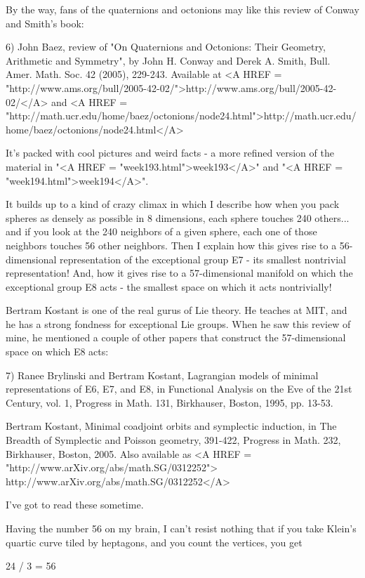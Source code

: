 By the way, fans of the quaternions and octonions may like this
review of Conway and Smith's book:

6) John Baez, review of "On Quaternions and Octonions: Their Geometry,
Arithmetic and Symmetry", by John H. Conway and Derek A. Smith,
Bull. Amer. Math. Soc. 42 (2005), 229-243.  Available at 
<A HREF = "http://www.ams.org/bull/2005-42-02/">http://www.ams.org/bull/2005-42-02/</A> and 
<A HREF = "http://math.ucr.edu/home/baez/octonions/node24.html">http://math.ucr.edu/home/baez/octonions/node24.html</A>

It's packed with cool pictures and weird facts - a more refined
version of the material in "<A HREF = "week193.html">week193</A>" and "<A HREF = "week194.html">week194</A>".  

It builds up to a kind of crazy climax in which I describe how when you 
pack spheres as densely as possible in 8 dimensions, each sphere touches 
240 others... and if you look at the 240 neighbors of a given sphere, each 
one of those neighbors touches 56 other neighbors.  Then I explain how this 
gives rise to a 56-dimensional representation of the exceptional group E7 -
its smallest nontrivial representation!  And, how it
gives rise to a 57-dimensional manifold on which the exceptional group E8 
acts - the smallest space on which it acts nontrivially!   

Bertram Kostant is one of the real gurus of Lie theory.  He teaches at
MIT, and he has a strong fondness for exceptional Lie groups.  When he saw 
this review of mine, he mentioned a couple of other papers that construct 
the 57-dimensional space on which E8 acts:

7) Ranee Brylinski and Bertram Kostant, Lagrangian models of minimal
representations of E6, E7, and E8, in Functional Analysis on the Eve
of the 21st Century, vol. 1, Progress in Math. 131, Birkhauser, Boston, 
1995, pp. 13-53.

Bertram Kostant, Minimal coadjoint orbits and symplectic induction,
in The Breadth of Symplectic and Poisson geometry, 391-422, 
Progress in Math. 232, Birkhauser, Boston, 2005.  Also
available as <A HREF = "http://www.arXiv.org/abs/math.SG/0312252">
http://www.arXiv.org/abs/math.SG/0312252</A>

I've got to read these sometime.

Having the number 56 on my brain, I can't resist nothing that if
you take Klein's quartic curve tiled by heptagons, and you count 
the vertices, you get 

24  / 3 = 56

